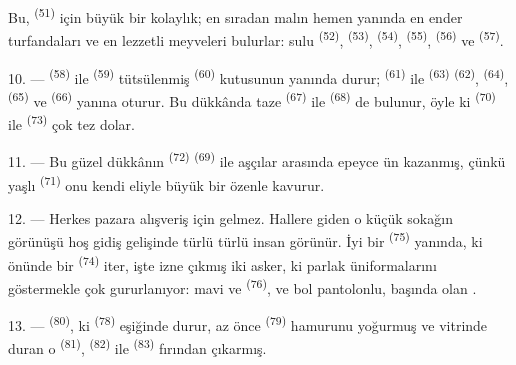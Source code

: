 Bu,  \textsuperscript{(51)} için büyük bir kolaylık;
en sıradan malın hemen yanında en ender turfandaları ve en lezzetli meyveleri
bulurlar: sulu  \textsuperscript{(52)}, 
\textsuperscript{(53)},  \textsuperscript{(54)},
 \textsuperscript{(55)}, 
\textsuperscript{(56)} ve  \textsuperscript{(57)}.

\VUsaut{4.0mm}
\VUsaut{3.0mm}

10. ---  \textsuperscript{(58)} ile 
\textsuperscript{(59)} tütsülenmiş  \textsuperscript{(60)}
kutusunun yanında durur;  \textsuperscript{(61)} ile
 \textsuperscript{(63)} 
\textsuperscript{(62)},  \textsuperscript{(64)},
 \textsuperscript{(65)} ve 
\textsuperscript{(66)} yanına oturur. Bu dükkânda taze 
\textsuperscript{(67)} ile  \textsuperscript{(68)} de bulunur,
öyle ki  \textsuperscript{(70)} ile 
\textsuperscript{(73)} çok tez dolar.

11. --- Bu güzel dükkânın  \textsuperscript{(72)}
 \textsuperscript{(69)} ile aşçılar arasında epeyce
ün kazanmış, çünkü yaşlı  \textsuperscript{(71)} onu kendi
eliyle büyük bir özenle kavurur.

\VUsaut{4.0mm}
\VUsaut{3.0mm}

12. --- Herkes pazara alışveriş için gelmez. Hallere giden o küçük sokağın
görünüşü hoş gidiş gelişinde türlü türlü insan görünür. İyi bir  \textsuperscript{(75)} yanında, ki
önünde bir  \textsuperscript{(74)} iter, işte izne çıkmış iki asker, ki
parlak üniformalarını göstermekle çok gururlanıyor: mavi  ve
  \textsuperscript{(76)}, ve bol
pantolonlu, başında  olan .

13. ---  \textsuperscript{(80)}, ki 
\textsuperscript{(78)} eşiğinde durur, az önce 
\textsuperscript{(79)} hamurunu yoğurmuş ve vitrinde duran o
 \textsuperscript{(81)}, 
\textsuperscript{(82)} ile  \textsuperscript{(83)}
fırından çıkarmış.

